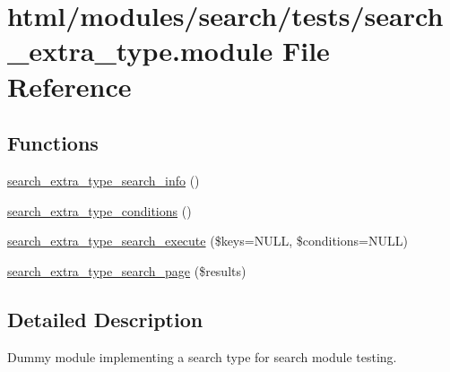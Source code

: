 \hypertarget{search__extra__type_8module}{
\section{html/modules/search/tests/search\_\-extra\_\-type.module File Reference}
\label{search__extra__type_8module}
}
\subsection*{Functions}
\begin{DoxyCompactItemize}
\item 
\hyperlink{search__extra__type_8module_aa9c6c6c236d1bd8a965567c760da729b}{search\_\-extra\_\-type\_\-search\_\-info} ()
\item 
\hyperlink{search__extra__type_8module_a07a5626108879a6b58aed84710846928}{search\_\-extra\_\-type\_\-conditions} ()
\item 
\hyperlink{search__extra__type_8module_a947838e02dba6b772e681d2808ab6001}{search\_\-extra\_\-type\_\-search\_\-execute} (\$keys=NULL, \$conditions=NULL)
\item 
\hyperlink{search__extra__type_8module_a3d5a2c40c1ed5f0f59b8dad1e82032a2}{search\_\-extra\_\-type\_\-search\_\-page} (\$results)
\end{DoxyCompactItemize}


\subsection{Detailed Description}
Dummy module implementing a search type for search module testing. 

